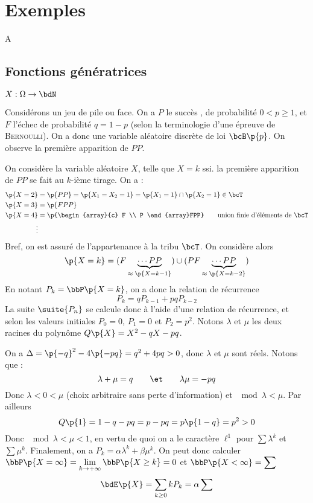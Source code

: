 \documentclass[a4paper,french,bookmarks]{book}
\begin{document}
    \section{Exemples}
    
A    \subsection{Fonctions génératrices}
    
    $X : \Omega \to \bdN$
    
    
    \newpage
    
    Considérons un jeu de pile ou face. On a $P$ le succès , de probabilité $0 < p \geq 1$, et $F$ l'échec  de probabilité $q = 1 - p$ (selon la terminologie d'une épreuve de \textsc{Bernoulli}). On a donc une variable aléatoire discrète de loi $\bcB\p{p}$. On observe la première apparition de $PP$.\medskip
    
    On considère la variable aléatoire $X$, telle que $X = k$ ssi. la première apparition de $PP$ se fait au $k$-ième tirage. On a :
    \begin{align*}
        \p{X = 2} &= \p{PP} = \p{X_1 = X_2 = 1} = \p{X_1 = 1} \cap \p{X_2 = 1} \in \bcT\\
        \p{X = 3} &= \p{FPP}\\
        \p{X = 4} &= \p{\begin{array}{c}
            F  \\
            P
        \end{array}FPP} \qquad\text{union finie d'éléments de } \bcT\\
        \vdots
    \end{align*}
    Bref, on est assuré de l'appartenance à la tribu $\bcT$. On considère alors
    \[ \p{X = k} = (F\underbrace{ \cdots PP}_{\approx\; \p{X = k-1}}) \cup (PF\underbrace{\cdots PP}_{\approx\; \p{X = k-2}})\]
    En notant $P_k = \bbP\p{X = k}$, on a donc la relation de récurrence
    \[ P_k = qP_{k-1} + pqP_{k-2} \]
    La suite $\suite{P_n}$ se calcule donc à l'aide d'une relation de récurrence, et selon les valeurs initiales $P_0 = 0$, $P_1 = 0$ et $P_2 = p^2$. Notons $\lambda$ et $\mu$ les deux racines du polynôme $Q\p{X} = X^2 - qX - pq$.
    
    On a $\Delta = \p{-q}^2 -4\p{-pq} = q^2 + 4pq > 0$, donc $\lambda$ et $\mu$ sont réels. Notons que :
    \[ \lambda + \mu = q \qquad\et\qquad \lambda \mu = -pq\]
    Donc $\lambda < 0 < \mu$ (choix arbitraire sans perte d'information) et $\mod{\lambda} < \mu$. Par ailleurs 
    \[ Q\p{1} = 1 - q - pq = p - pq = p\p{1 - q} = p^2 > 0\]
    Donc $\mod{\lambda} <  \mu < 1$, en vertu de quoi on a le caractère $\ell^1$ pour $\sum \lambda^k$ et $\sum \mu^k$. Finalement, on a $P_k = \alpha \lambda^k + \beta \mu^k$. On peut donc calculer $\bbP\p{X = \infty} = \lim\limits_{k \to +\infty} \bbP\p{X \geq k} = 0$ et $\bbP\p{X < \infty} = \displaystyle\sum$
    \[ \bdE\p{X} = \sum_{k \geq 0} kP_k = \alpha\sum_{}\]
    
\end{document}
